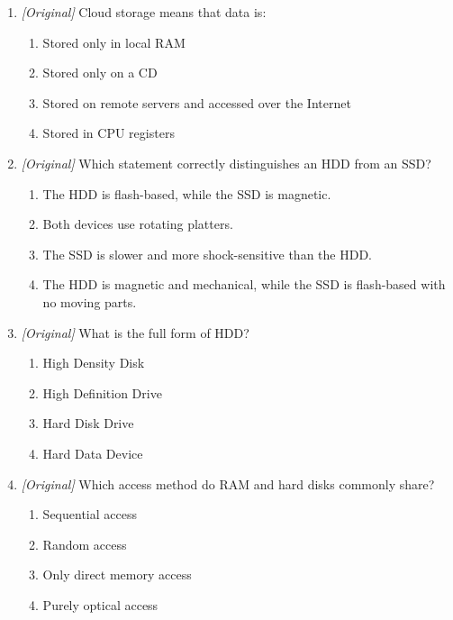 \begin{enumerate}[label=\textbf{Q\arabic*.}, leftmargin=*]
  \begin{enumerate}[label=\Alph*.]
    \item I only
    \item I and II only
    \item II and III only
    \item I, II, and III
  \end{enumerate}
\item \textit{[Original]} Cloud storage means that data is:
  \begin{enumerate}[label=\Alph*.]
    \item Stored only in local RAM
    \item Stored only on a CD
    \item Stored on remote servers and accessed over the Internet
    \item Stored in CPU registers
  \end{enumerate}
\item \textit{[Original]} Which statement correctly distinguishes an HDD
  from an SSD?
  \begin{enumerate}[label=\Alph*.]
    \item The HDD is flash-based, while the SSD is magnetic.
    \item Both devices use rotating platters.
    \item The SSD is slower and more shock-sensitive than the HDD.
    \item The HDD is magnetic and mechanical, while the SSD is flash-based
      with no moving parts.
  \end{enumerate}
\item \textit{[Original]} What is the full form of HDD?
  \begin{enumerate}[label=\Alph*.]
    \item High Density Disk
    \item High Definition Drive
    \item Hard Disk Drive
    \item Hard Data Device
  \end{enumerate}
\item \textit{[Original]} Which access method do RAM and hard disks commonly
  share?
  \begin{enumerate}[label=\Alph*.]
    \item Sequential access
    \item Random access
    \item Only direct memory access
    \item Purely optical access

\end{enumerate}
\end{enumerate}
